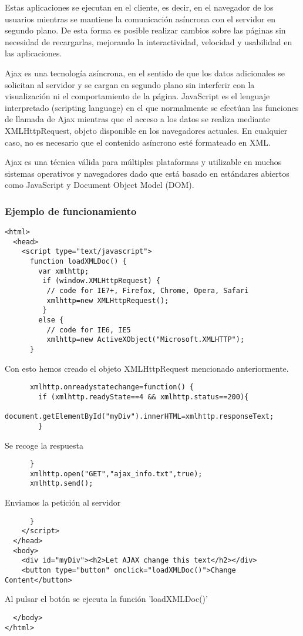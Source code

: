 \documentclass{apuntes}
\begin{document}
Estas aplicaciones se ejecutan en el cliente, es decir, en el navegador de los usuarios mientras se mantiene la comunicación asíncrona con el servidor en segundo plano. De esta forma es posible realizar cambios sobre las páginas sin necesidad de recargarlas, mejorando la interactividad, velocidad y usabilidad en las aplicaciones.

Ajax es una tecnología asíncrona, en el sentido de que los datos adicionales se solicitan al servidor y se cargan en segundo plano sin interferir con la visualización ni el comportamiento de la página. JavaScript es el lenguaje interpretado (scripting language) en el que normalmente se efectúan las funciones de llamada de Ajax mientras que el acceso a los datos se realiza mediante XMLHttpRequest, objeto disponible en los navegadores actuales. En cualquier caso, no es necesario que el contenido asíncrono esté formateado en XML.

Ajax es una técnica válida para múltiples plataformas y utilizable en muchos sistemas operativos y navegadores dado que está basado en estándares abiertos como JavaScript y Document Object Model (DOM).

\subsubsection{Ejemplo de funcionamiento}
\small
\begin{verbatim}
<html>
  <head>
    <script type="text/javascript">
      function loadXMLDoc() {
        var xmlhttp;
         if (window.XMLHttpRequest) {
          // code for IE7+, Firefox, Chrome, Opera, Safari
          xmlhttp=new XMLHttpRequest();
         }
        else {
          // code for IE6, IE5
          xmlhttp=new ActiveXObject("Microsoft.XMLHTTP");
      }
\end{verbatim}
\normalsize
Con esto hemos creado el objeto XMLHttpRequest mencionado anteriormente.
\small
\begin{verbatim}
      xmlhttp.onreadystatechange=function() {
        if (xmlhttp.readyState==4 && xmlhttp.status==200){
          document.getElementById("myDiv").innerHTML=xmlhttp.responseText;
        }
\end{verbatim}
\normalsize
Se recoge la respuesta
\small
\begin{verbatim}
      }
      xmlhttp.open("GET","ajax_info.txt",true);
      xmlhttp.send();
\end{verbatim}
\normalsize
Enviamos la petición al servidor
\small
\begin{verbatim}
      }
    </script>
  </head>
  <body>
    <div id="myDiv"><h2>Let AJAX change this text</h2></div>
    <button type="button" onclick="loadXMLDoc()">Change Content</button>
\end{verbatim}
\normalsize
Al pulsar el botón se ejecuta la función 'loadXMLDoc()'
\small
\begin{verbatim}
  </body>
</html>
\end{verbatim}
\end{document}
